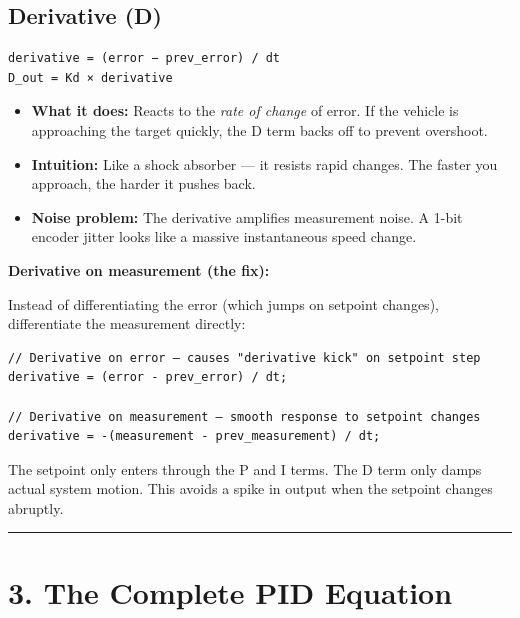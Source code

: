 \documentclass[12pt,a4paper,oneside]{report}
\providecommand{\tightlist}{\setlength{\itemsep}{0pt}\setlength{\parskip}{0pt}}
\begin{document}
\subsection{Derivative (D)}\label{derivative-d}

\begin{verbatim}
derivative = (error − prev_error) / dt
D_out = Kd × derivative
\end{verbatim}

\begin{itemize}
\tightlist
\item
  \textbf{What it does:} Reacts to the \emph{rate of change} of error. If the
  vehicle is approaching the target quickly, the D term backs off to prevent
  overshoot.
\item
  \textbf{Intuition:} Like a shock absorber --- it resists rapid changes. The
  faster you approach, the harder it pushes back.
\item
  \textbf{Noise problem:} The derivative amplifies measurement noise. A 1-bit
  encoder jitter looks like a massive instantaneous speed change.
\end{itemize}

\textbf{Derivative on measurement (the fix):}

Instead of differentiating the error (which jumps on setpoint changes),
differentiate the measurement directly:

\begin{verbatim}
// Derivative on error — causes "derivative kick" on setpoint step
derivative = (error - prev_error) / dt;

// Derivative on measurement — smooth response to setpoint changes
derivative = -(measurement - prev_measurement) / dt;
\end{verbatim}

The setpoint only enters through the P and I terms. The D term only damps actual
system motion. This avoids a spike in output when the setpoint changes abruptly.

\begin{center}\rule{0.5\linewidth}{0.5pt}\end{center}

\section{3. The Complete PID Equation}\label{the-complete-pid-equation}
\end{document}
